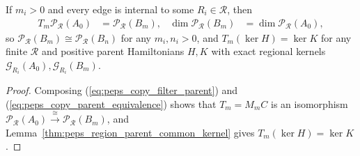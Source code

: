 \begin{lemma}%
    \label{thm:peps_copy_positive_parent}
    \leanok
    If $m_i>0$ and every edge is internal to some $R_i\in\mathcal R$, then
    \begin{align}
        T_m\mathcal P_{\mathcal R}(A_0) & =\mathcal P_{\mathcal R}(B_m),
                                        & \dim\mathcal P_{\mathcal R}(B_m) & =\dim\mathcal P_{\mathcal R}(A_0),
    \end{align}
    so $\mathcal P_{\mathcal R}(B_m)\cong\mathcal P_{\mathcal R}(B_n)$ for any $m_i,n_i>0$, and $T_m(\ker H)=\ker K$ for any finite $\mathcal R$ and positive parent Hamiltonians $H,K$ with exact regional kernels $\mathcal G_{R_i}(A_0),\mathcal G_{R_i}(B_m)$.
\end{lemma}
\begin{proof}\leanok
    Composing (\ref{eq:peps_copy_filter_parent}) and (\ref{eq:peps_copy_parent_equivalence}) shows that $T_m=M_mC$ is an isomorphism $\mathcal P_{\mathcal R}(A_0)\xrightarrow{\cong}\mathcal P_{\mathcal R}(B_m)$, and Lemma~\ref{thm:peps_region_parent_common_kernel} gives $T_m(\ker H)=\ker K$.
\end{proof}

